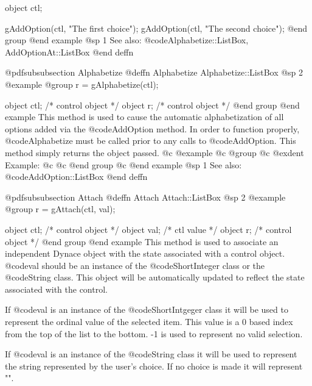 object  ctl;

gAddOption(ctl, "The first choice");
gAddOption(ctl, "The second choice");
@end group
@end example
@sp 1
See also:  @code{Alphabetize::ListBox, AddOptionAt::ListBox}
@end deffn















@pdfsubsubsection {Alphabetize}
@deffn {Alphabetize} Alphabetize::ListBox
@sp 2
@example
@group
r = gAlphabetize(ctl);

object  ctl;    /*  control object  */
object  r;      /*  control object  */
@end group
@end example
This method is used to cause the automatic alphabetization of all
options added via the @code{AddOption} method.  In order to function
properly, @code{Alphabetize} must be called prior to any calls to
@code{AddOption}.  This method simply returns the object passed.
@c @example
@c @group
@c @exdent Example:
@c 
@c @end group
@c @end example
@sp 1
See also:  @code{AddOption::ListBox}
@end deffn















@pdfsubsubsection {Attach}
@deffn {Attach} Attach::ListBox
@sp 2
@example
@group
r = gAttach(ctl, val);

object  ctl;   /*  control object  */
object  val;   /*  ctl value       */
object  r;     /*  control object  */
@end group
@end example
This method is used to associate an independent Dynace object with the
state associated with a control object.  @code{val} should be an
instance of the @code{ShortInteger} class or the @code{String} class.
This object will be automatically updated to reflect the state
associated with the control.

If @code{val} is an instance of the @code{ShortIntgeger} class it will
be used to represent the ordinal value of the selected item.  This value
is a 0 based index from the top of the list to the bottom.  -1 is used
to represent no valid selection.

If @code{val} is an instance of the @code{String} class it will be used
to represent the string represented by the user's choice.  If no choice is
made it will represent "".

